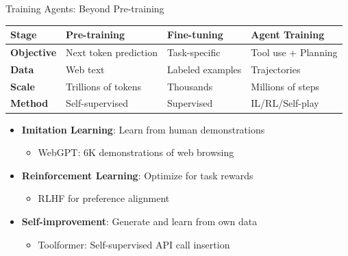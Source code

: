 \documentclass[aspectratio=169]{beamer}
\begin{document}
\begin{frame}{Training Agents: Beyond Pre-training}
	\begin{tabular}{|l|p{3cm}|p{3cm}|p{3cm}|}
		\hline
		\textbf{Stage} & \textbf{Pre-training} & \textbf{Fine-tuning} & \textbf{Agent Training} \\
		\hline
		\textbf{Objective} & Next token prediction & Task-specific & Tool use + Planning \\
		\hline
		\textbf{Data} & Web text & Labeled examples & Trajectories \\
		\hline
		\textbf{Scale} & Trillions of tokens & Thousands & Millions of steps \\
		\hline
		\textbf{Method} & Self-supervised & Supervised & IL/RL/Self-play \\
		\hline
	\end{tabular}
	
	\vspace{0.5cm}
	
	\begin{itemize}
		\item {\color{highlight}\textbf{Imitation Learning}}: Learn from human demonstrations
		\begin{itemize}
			\item WebGPT: 6K demonstrations of web browsing
		\end{itemize}
		\item {\color{highlight}\textbf{Reinforcement Learning}}: Optimize for task rewards
		\begin{itemize}
			\item RLHF for preference alignment
		\end{itemize}
		\item {\color{highlight}\textbf{Self-improvement}}: Generate and learn from own data
		\begin{itemize}
			\item Toolformer: Self-supervised API call insertion
		\end{itemize}
	\end{itemize}
\end{frame}
\end{document}
